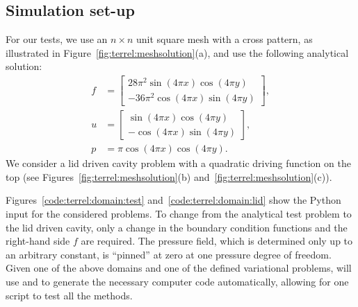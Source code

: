 \subsection{Simulation set-up}

For our tests, we use an $n \times n$ unit square mesh with a cross
pattern, as illustrated in Figure~\ref{fig:terrel:meshsolution}(a),
and use the following analytical solution:
%
\begin{align}
\label{eqn:terrel:testcase}
  f &=
    \begin{bmatrix}
      28\pi^2\sin(4\pi x)\cos(4\pi y)
      \\
      -36\pi^2\cos(4\pi x)\sin(4\pi y)
    \end{bmatrix},
\\
  u &=
  \begin{bmatrix}
    \sin(4\pi x)\cos(4\pi y)
      \\
     -\cos(4\pi x)\sin(4\pi y)
   \end{bmatrix},
\\
  p &= \pi\cos(4\pi x)\cos(4\pi y).
\end{align}
%
We consider a lid driven cavity problem with a quadratic
driving function on the top (see Figures~\ref{fig:terrel:meshsolution}(b)
and~\ref{fig:terrel:meshsolution}(c)).

Figures~\ref{code:terrel:domain:test} and~\ref{code:terrel:domain:lid}
show the \dolfin{} Python input for the considered problems.  To change
from the analytical test problem to the lid driven cavity, only a
change in the boundary condition functions and the right-hand side
$f$ are required.  The pressure field, which is determined only up to
an arbitrary constant, is ``pinned'' at zero at one pressure degree
of freedom.  Given one of the above domains and one of the defined
variational problems, \dolfin{} will use \ffc{} and \fiat{} to generate
the necessary computer code automatically, allowing for one script to
test all the methods.

